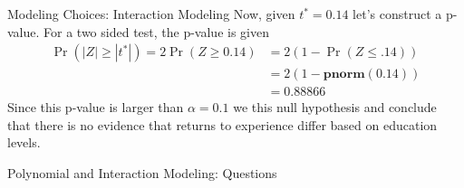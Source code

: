 \documentclass[notheorems,9pt, handout]{beamer}
\begin{document}
\begin{frame}{Modeling Choices: Interaction Modeling} 
	\label{frame:interaction3}
	Now, given \(t^* = 0.14\) let's construct a p-value. For a two sided test, the p-value is given 
	\begin{align*}
		\Pr(|Z| \geq |t^*|) = 2\Pr(Z \geq 0.14) &= 2\left(1 - \Pr(Z\leq .14)\right) \\
											   &= 2\left(1 - \textbf{pnorm}(0.14)\right) \\
											   &= 0.88866
	\end{align*} 
	\onslide<2->
	Since this p-value is larger than \(\alpha = 0.1\) we  this null hypothesis and conclude that there is no evidence that returns to experience differ based on education levels.
\end{frame}
\begin{frame}{Polynomial and Interaction Modeling: Questions}
	\centering
\end{frame} 
\end{document}
